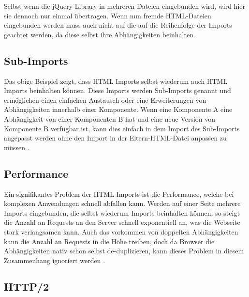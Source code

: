

Selbst wenn die jQuery-Library in mehreren Dateien eingebunden wird, wird hier sie dennoch nur einmal übertragen. Wenn nun fremde \ac{HTML}-Dateien eingebunden werden muss auch nicht auf die auf die Reihenfolge der Imports geachtet werden, da diese selbst ihre Abhängigkeiten beinhalten.


\subsection{Sub-Imports}\label{sub-imports}

Das obige Beispiel zeigt, dass \ac{HTML} Imports selbst wiederum auch \ac{HTML} Imports beinhalten können. Diese Imports werden Sub-Imports genannt und ermöglichen einen einfachen Austausch oder eine Erweiterungen von Abhängigkeiten innerhalb einer Komponente. Wenn eine Komponente A eine Abhängigkeit von einer Komponenten B hat und eine neue Version von Komponente B verfügbar ist, kann dies einfach in dem Import des Sub-Imports angepasst werden ohne den Import in der Eltern-\ac{HTML}-Datei anpassen zu müssen \cite{citeulike:13853647}.


\subsection{Performance}\label{html-import-performance}

Ein signifikantes Problem der \ac{HTML} Imports ist die Performance, welche bei komplexen Anwendungen schnell abfallen kann. Werden auf einer Seite mehrere Imports eingebunden, die selbst wiederum Imports beinhalten können, so steigt die Anzahl an Requests an den Server schnell exponentiell an, was die Webseite stark verlangsamen kann. Auch das vorkommen von doppelten Abhängigkeiten kann die Anzahl an Requests in die Höhe treiben, doch da Browser die Abhängigkeiten nativ schon selbst de-duplizieren, kann dieses Problem in diesem Zusammenhang ignoriert werden \cite{citeulike:13853714}.


\subsection{\ac{HTTP}/2}\label{http2}

